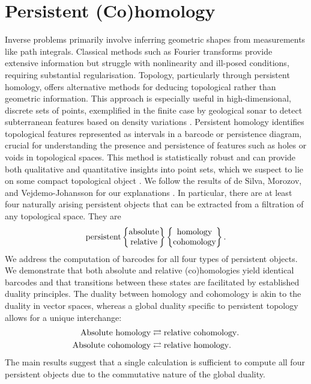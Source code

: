 \section{Persistent (Co)homology}
\label{Persistent(Co)homology}
Inverse problems primarily involve inferring geometric shapes from measurements like
path integrals. Classical methods such as Fourier transforms provide extensive
information but struggle with nonlinearity and ill-posed conditions, requiring substantial
regularisation. Topology, particularly through persistent homology, offers
alternative methods for deducing topological rather than geometric information. This
approach is especially useful in high-dimensional, discrete sets of points, exemplified
in the finite case by geological sonar to detect subterranean features based on density
variations \cite[\S 1]{de2011dualities}. Persistent homology identifies
topological features represented as intervals in a barcode or persistence
diagram, crucial for understanding the presence and persistence of features such
as holes or voids in topological spaces. This method is statistically robust and
can provide both qualitative and quantitative insights into point sets, which we
suspect to lie on some compact topological object \cite{chazal2014persistence,chazal2009proximity}. We follow the results
of de Silva, Morozov, and Vejdemo-Johansson for our explanations \cite[\S 1]{de2011dualities}. In particular, there are at least four naturally arising persistent objects that
can be extracted from a filtration of any topological space.
They are
\begin{equation*}
	\text{persistent}
	\begin{Bmatrix}
		\text{absolute} \\
		\text{relative}
	\end{Bmatrix}
	\begin{Bmatrix}
		\text{homology\index{homology}}   \\
		\text{cohomology\index{cohomology}}
	\end{Bmatrix}.
\end{equation*}
We address the computation of barcodes for all four types of persistent
objects. We demonstrate that both absolute and relative (co)homologies yield identical
barcodes and that transitions between these states are facilitated by established
duality principles. The duality between homology and cohomology is akin to the
duality in vector spaces, whereas a global duality specific to persistent topology
allows for a unique interchange:
\begin{align*}
	\text{Absolute homology\index{homology}}   & \rightleftarrows \text{relative cohomology\index{cohomology}.} \\
	\text{Absolute cohomology\index{cohomology}} & \rightleftarrows \text{relative homology\index{homology}.}
\end{align*}
The main results suggest that a single calculation is sufficient
to compute all four persistent objects due to the commutative nature of the global
duality.

